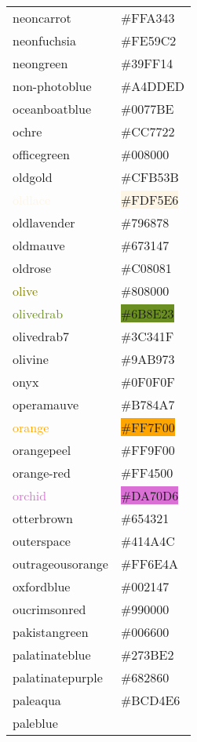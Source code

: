 \documentclass[
]{article}
\begin{document}
\begin{longtable}[]{@{}ll@{}}
\textcolor{neoncarrot}{neoncarrot} &
\colorbox{neoncarrot}{\#FFA343}\tabularnewline
\textcolor{neonfuchsia}{neonfuchsia} &
\colorbox{neonfuchsia}{\#FE59C2}\tabularnewline
\textcolor{neongreen}{neongreen} &
\colorbox{neongreen}{\#39FF14}\tabularnewline
\textcolor{non-photoblue}{non-photoblue} &
\colorbox{non-photoblue}{\#A4DDED}\tabularnewline
\textcolor{oceanboatblue}{oceanboatblue} &
\colorbox{oceanboatblue}{\#0077BE}\tabularnewline
\textcolor{ochre}{ochre} & \colorbox{ochre}{\#CC7722}\tabularnewline
\textcolor{officegreen}{officegreen} &
\colorbox{officegreen}{\#008000}\tabularnewline
\textcolor{oldgold}{oldgold} &
\colorbox{oldgold}{\#CFB53B}\tabularnewline
\textcolor{oldlace}{oldlace} &
\colorbox{oldlace}{\#FDF5E6}\tabularnewline
\textcolor{oldlavender}{oldlavender} &
\colorbox{oldlavender}{\#796878}\tabularnewline
\textcolor{oldmauve}{oldmauve} &
\colorbox{oldmauve}{\#673147}\tabularnewline
\textcolor{oldrose}{oldrose} &
\colorbox{oldrose}{\#C08081}\tabularnewline
\textcolor{olive}{olive} & \colorbox{heartgold}{\#808000}\tabularnewline
\textcolor{olivedrab}{olivedrab} &
\colorbox{olivedrab}{\#6B8E23}\tabularnewline
\textcolor{olivedrab7}{olivedrab7} &
\colorbox{olivedrab7}{\#3C341F}\tabularnewline
\textcolor{olivine}{olivine} &
\colorbox{olivine}{\#9AB973}\tabularnewline
\textcolor{onyx}{onyx} & \colorbox{onyx}{\#0F0F0F}\tabularnewline
\textcolor{operamauve}{operamauve} &
\colorbox{operamauve}{\#B784A7}\tabularnewline
\textcolor{orange}{orange} & \colorbox{orange}{\#FF7F00}\tabularnewline
\textcolor{orangepeel}{orangepeel} &
\colorbox{orangepeel}{\#FF9F00}\tabularnewline
\textcolor{orange-red}{orange-red} &
\colorbox{orange-red}{\#FF4500}\tabularnewline
\textcolor{orchid}{orchid} & \colorbox{orchid}{\#DA70D6}\tabularnewline
\textcolor{otterbrown}{otterbrown} &
\colorbox{darkbrown}{\#654321}\tabularnewline
\textcolor{outerspace}{outerspace} &
\colorbox{outerspace}{\#414A4C}\tabularnewline
\textcolor{outrageousorange}{outrageousorange} &
\colorbox{outrageousorange}{\#FF6E4A}\tabularnewline
\textcolor{oxfordblue}{oxfordblue} &
\colorbox{oxfordblue}{\#002147}\tabularnewline
\textcolor{oucrimsonred}{oucrimsonred} &
\colorbox{oucrimsonred}{\#990000}\tabularnewline
\textcolor{pakistangreen}{pakistangreen} &
\colorbox{pakistangreen}{\#006600}\tabularnewline
\textcolor{palatinateblue}{palatinateblue} &
\colorbox{palatinateblue}{\#273BE2}\tabularnewline
\textcolor{palatinatepurple}{palatinatepurple} &
\colorbox{palatinatepurple}{\#682860}\tabularnewline
\textcolor{paleaqua}{paleaqua} &
\colorbox{beaublue}{\#BCD4E6}\tabularnewline
\textcolor{paleblue}{paleblue} &

\end{longtable}
\end{document}
